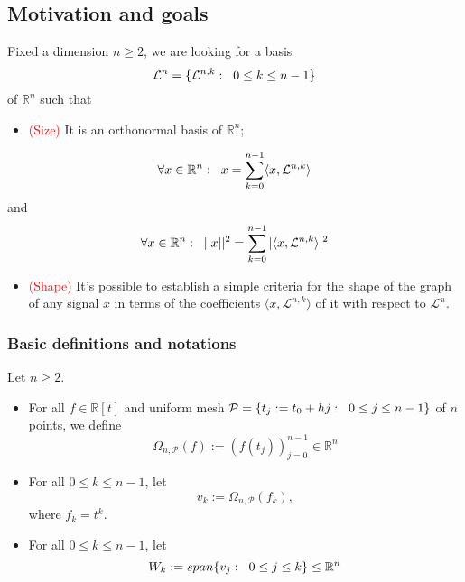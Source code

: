 \documentclass[]{beamer}
\theoremstyle{definition}
\newcommand{\IR}{\mathbb{R}}
\newcommand{\suma}[3]{\sum\limits_{#1}^{#2}#3} %
\newcommand{\cali}[1]{\mathcal{#1}} %
\begin{document}
\begin{frame}
\subsection{Motivation and goals}
Fixed a dimension $n \geq 2$, we are looking for a
basis $$\cali{L}^{n} = \{\cali{L}^{n,k}: \hspace{0.2cm}
0 \leq k \leq n-1\}$$ of $\IR^{n}$ such that
\begin{itemize}
	\item \textcolor{red}{(Size)}
	It is an orthonormal basis of $\IR^{n}$;
\end{itemize}
\[
\forall x\in \IR^{n}: \hspace{0.2cm} x = \suma{k=0}{n-1}{
\langle x, \cali{L}^{n,k} \rangle
}
\]
and
\[
\forall x\in \IR^{n}: \hspace{0.2cm} || x ||^{2} = \suma{k=0}{n-1}{
| \langle x, \cali{L}^{n,k} \rangle |^{2}
}
\]
\begin{itemize}
	\item \textcolor{red}{(Shape)}
	It's possible to establish a simple criteria 
	for the shape of the graph of any signal $x$	
	in terms
	of the coefficients  
	$\langle x, \cali{L}^{n,k} \rangle$ of it with respect
	to $\cali{L}^{n}$.
\end{itemize}


\end{frame}


\begin{frame}
\frametitle{Basic definitions and notations}
Let $n \geq 2$.
\begin{itemize}
	\item For all $f \in \IR[t]$ and uniform mesh
	$\cali{P} = \{ t_{j} := t_{0}+ hj : 
	\hspace{0.2cm} 0 \leq j \leq n-1 \}$ of $n$ points, we define
	\[
	\Omega_{n, \cali{P}}(f) := (f(t_{j}))_{j=0}^{n-1} \in \IR^{n}
	\]
	\item For all $0 \leq k \leq n-1$, let
	\[
	v_{k} := \Omega_{n, \cali{P}}(f_{k}),
	\]
	where $f_{k} = t^{k}$.
	\item For all $0 \leq k \leq n-1$, let
	\[
	W_{k} := span \{ v_{j} : \hspace{0.2cm} 0 \leq j \leq k \} \leq \IR^{n}
	\]
\end{itemize}
\end{frame}
\end{document}

